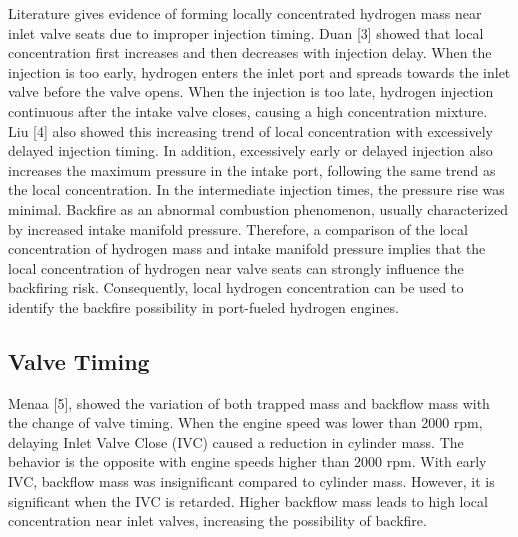 \documentclass[conference]{IEEEtran}
\begin{document}
Literature gives evidence of forming locally concentrated hydrogen mass near inlet valve seats due to improper injection timing.
Duan [3] showed that local concentration first increases and then decreases with injection delay.
When the injection is too early, hydrogen enters the inlet port and spreads towards the inlet valve before the valve opens.
When the injection is too late, hydrogen injection continuous after the intake valve closes, causing a high concentration mixture.
Liu [4] also showed this increasing trend of local concentration with excessively delayed injection timing.
In addition, excessively early or delayed injection also increases the maximum pressure in the intake port, following the same trend as the local concentration.
In the intermediate injection times, the pressure rise was minimal.
Backfire as an abnormal combustion phenomenon, usually characterized by increased intake manifold pressure.
Therefore, a comparison of the local concentration of hydrogen mass and intake manifold pressure implies that the local concentration of hydrogen near valve seats can strongly influence the backfiring risk.
Consequently, local hydrogen concentration can be used to identify the backfire possibility in port-fueled hydrogen engines.\\

\subsection{Valve Timing}

Menaa [5], showed the variation of both trapped mass and backflow mass with the change of valve timing.
When the engine speed was lower than 2000 rpm, delaying Inlet Valve Close (IVC) caused a reduction in cylinder mass.
The behavior is the opposite with engine speeds higher than 2000 rpm.
With early IVC, backflow mass was insignificant compared to cylinder mass.
However, it is significant when the IVC is retarded.
Higher backflow mass leads to high local concentration near inlet valves, increasing the possibility of backfire.\\
\end{document}
